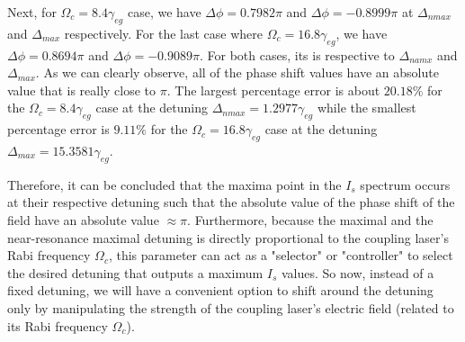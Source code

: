 Next,  for $\Omega_{c} = 8.4\gamma_{eg}$ case, we have $\Delta\phi = 0.7982\pi$ and $\Delta\phi = -0.8999\pi$ at $\Delta_{nmax}$ and $\Delta_{max}$ respectively. For the last case where $\Omega_{c} = 16.8\gamma_{eg}$, we have $\Delta\phi = 0.8694\pi$ and $\Delta\phi = -0.9089\pi$. For both cases, its is respective to $\Delta_{namx}$ and $\Delta_{max}$. As we can clearly observe, all of the phase shift values have an absolute value that is really close to $\pi$. The largest percentage error is about $20.18\%$ for the $\Omega_{c} = 8.4\gamma_{eg}$ case at the detuning $\Delta_{nmax} = 1.2977\gamma_{eg}$ while the smallest percentage error is $9.11\%$ for the $\Omega_{c} = 16.8\gamma_{eg}$ case at the detuning $\Delta_{max} = 15.3581\gamma_{eg}$.

Therefore, it can be concluded that the maxima point in the $I_{s}$ spectrum occurs at their respective detuning such that the absolute value of the phase shift of the field have an absolute value $\approx \pi$. Furthermore, because the maximal and the near-resonance maximal detuning is directly proportional to the coupling laser's Rabi frequency $\Omega_{c}$, this parameter can act as a "selector" or "controller" to select the desired detuning that outputs a maximum $I_{s}$ values. So now, instead of a fixed detuning, we will have a convenient option to shift around the detuning only by manipulating the strength of the coupling laser's electric field (related to its Rabi frequency $\Omega_{c}$).
